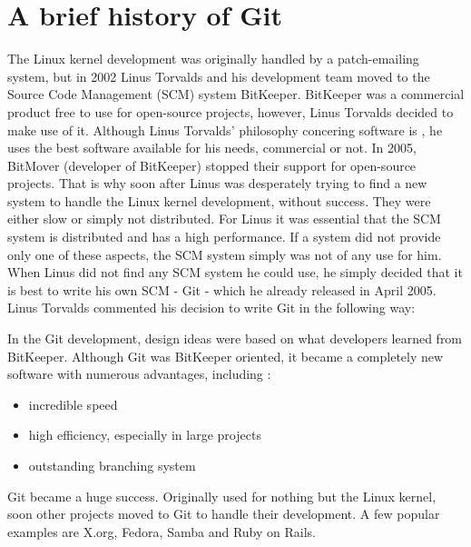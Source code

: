 \section {A brief history of Git}\label{githistory}

The Linux kernel development was originally handled by a patch-emailing system, but in 2002 Linus Torvalds and his development team moved to the Source Code Management (SCM) system BitKeeper. BitKeeper was a commercial product free to use for open-source projects, however, Linus Torvalds decided to make use of it. Although Linus Torvalds' philosophy concering software is  \cite{googletechtalk2007}, he uses the best software available for his needs, commercial or not.
In 2005, BitMover (developer of BitKeeper) stopped their support for open-source projects. That is why soon after Linus was desperately trying to find a new system to handle the Linux kernel development, without success. They were either slow or simply not distributed. For Linus it was essential that the SCM system is distributed and has a high performance. If a system did not provide only one of these aspects, the SCM system simply was not of any use for him. When Linus did not find any SCM system he could use, he simply decided that it is best to write his own SCM - Git - which he already released in April 2005. Linus Torvalds commented his decision to write Git in the following way: 

 \cite{googletechtalk2007}

In the Git development, design ideas were based on what developers learned from BitKeeper. Although Git was BitKeeper oriented, it became a completely new software with numerous advantages, including \cite{gitpro2009}:

\begin{itemize}
	\item incredible speed
	\item high efficiency, especially in large projects
	\item outstanding branching system
\end{itemize}

Git became a huge success. Originally used for nothing but the Linux kernel, soon other projects moved to Git to handle their development. A few popular examples are X.org, Fedora, Samba and Ruby on Rails. \cite{gitinternals2008}
